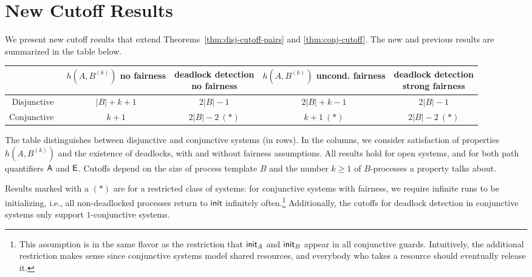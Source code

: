 \section{New Cutoff Results} \label{gua:sec:cutoffs}

We present new cutoff results that extend Theorems~\ref{thm:disj-cutoff-pairs} and \ref{thm:conj-cutoff}.
The new and previous results are summarized in the table below.

\begin{table}[h]
\centering
\label{table:cutoffs}
\centering
\setlength{\tabcolsep}{2pt}
{%
\begin{tabular}{ r|c|c|c|c }
   & \specialcellC{$h(A,B^{(k)})$ \\ no fairness} & \specialcellC{deadlock detection \\ no fairness} & \specialcellC{$h(A,B^{(k)})$ \\ uncond. fairness} & \specialcellC{deadlock detection \\ strong fairness}  \\[9pt]
\hline
Disjunctive~ & $|B| + k + 1$ &
        $2|B| - 1$ & 
        $2|B| + k - 1$ &
        $2|B| - 1$ 
          \\[4pt]
\hline
Conjunctive~ & 
        $k+1$ &  
        $2|B|-2~(*)$ & 
        $k+1~(*)$ &  
        $2|B|-2~(*)$
\end{tabular}
}
\end{table}
The table distinguishes between disjunctive and conjunctive systems (in rows).
In the columns,
we consider satisfaction of properties $h(A,B^{(k)})$ and the existence of deadlocks,
with and without fairness assumptions.
All results hold for open systems, and for both path quantifiers $\operatorname{\mathsf{A}}$ and $\operatorname{\mathsf{E}}$.
Cutoffs depend on the size of process template $B$ and the number $k \geq 1$ of $B$-processes a property talks about.

Results marked with a $(*)$ are for a restricted class of systems:
for conjunctive systems with fairness, we require infinite runs to be 
initializing, i.e., all non-deadlocked 
processes
return to 
${\sf init}$
infinitely often.\footnote{This assumption is in the same 
flavor as the restriction that ${\sf init}_A$ and ${\sf init}_B$ appear in 
all conjunctive guards. Intuitively, the additional restriction makes sense 
since conjunctive systems model shared resources, and everybody who takes a 
resource should eventually release it.}
Additionally, the cutoffs for deadlock detection in conjunctive systems only support $1$-conjunctive systems.

